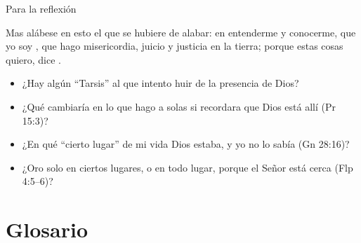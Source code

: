 \begin{frame}{Para la reflexión}
\begin{cita}Mas alábese en esto el que se hubiere de alabar: en entenderme y conocerme, que yo soy \SENOR, que hago misericordia, juicio y justicia en la tierra; porque estas cosas quiero, dice \SENOR.\end{cita}
\small
\begin{itemize}
\item ¿Hay algún ``Tarsis'' al que intento huir de la presencia de Dios?
\item ¿Qué cambiaría en lo que hago a solas si recordara que Dios está allí (Pr 15:3)?
\item ¿En qué ``cierto lugar'' de mi vida Dios estaba, y yo no lo sabía (Gn 28:16)?
\item ¿Oro solo en ciertos lugares, o en todo lugar, porque el Señor está cerca (Flp 4:5--6)?
\end{itemize}
\end{frame}

\section{Glosario}


